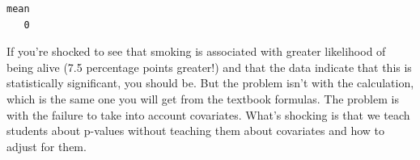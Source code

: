 \begin{example}
\begin{knitrout}
{\begin{kframe}
\begin{flushleft}
\hlstd{}\hlkeyword{(}\hlkeyword{,}{\ }\hlkeyword{(}\hlkeyword{(}\hlkeyword{)}{\ }\hlkeyword{\usebox{\hlnormalsizeboxgreaterthan}}{\ }\hlkeyword{(}\hlkeyword{)}\hlkeyword{)}\hlkeyword{)}{\ }{\ }\mbox{}
\normalfont
\end{flushleft}
\begin{verbatim}
mean 
   0 
\end{verbatim}
\end{kframe}}
\end{knitrout}

If you're shocked to see that smoking is associated with greater
likelihood of being alive (7.5 percentage points greater!) and that
the data indicate that this is statistically significant, you should
be.  But the problem isn't with the calculation, which is the same one
you will get from the textbook formulas.  The problem is with the
failure to take into account covariates.  What's shocking is that we
teach students about p-values without teaching them about covariates
and how to adjust for them.



\end{example}

